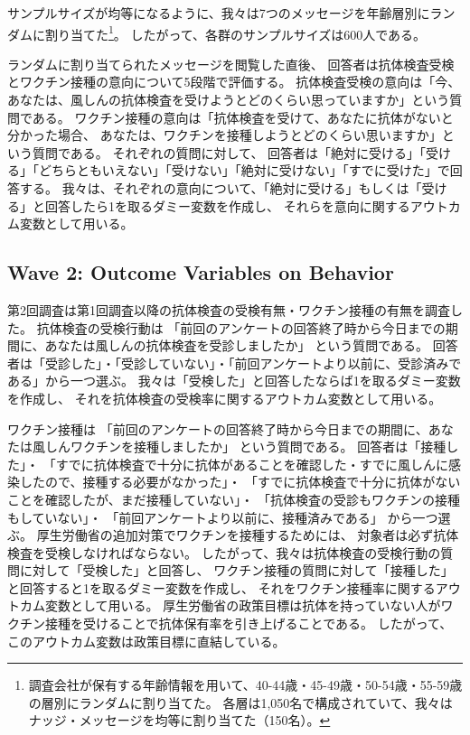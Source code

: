 \documentclass[
  11pt,
  a4paper,
]{article}
\begin{document}
サンプルサイズが均等になるように、我々は7つのメッセージを年齢層別にランダムに割り当てた\footnote{調査会社が保有する年齢情報を用いて、40-44歳・45-49歳・50-54歳・55-59歳の層別にランダムに割り当てた。
  各層は1,050名で構成されていて、我々はナッジ・メッセージを均等に割り当てた（150名）。}。
したがって、各群のサンプルサイズは600人である。

ランダムに割り当てられたメッセージを閲覧した直後、
回答者は抗体検査受検とワクチン接種の意向について5段階で評価する。
抗体検査受検の意向は「今、あなたは、風しんの抗体検査を受けようとどのくらい思っていますか」という質問である。
ワクチン接種の意向は「抗体検査を受けて、あなたに抗体がないと分かった場合、
あなたは、ワクチンを接種しようとどのくらい思いますか」という質問である。
それぞれの質問に対して、
回答者は「絶対に受ける」「受ける」「どちらともいえない」「受けない」「絶対に受けない」「すでに受けた」で回答する。
我々は、それぞれの意向について、「絶対に受ける」もしくは「受ける」と回答したら1を取るダミー変数を作成し、
それらを意向に関するアウトカム変数として用いる。

\hypertarget{wave2}{%
\subsection{Wave 2: Outcome Variables on Behavior}\label{wave2}}

第2回調査は第1回調査以降の抗体検査の受検有無・ワクチン接種の有無を調査した。
抗体検査の受検行動は
「前回のアンケートの回答終了時から今日までの期間に、あなたは風しんの抗体検査を受診しましたか」
という質問である。
回答者は「受診した」・「受診していない」・「前回アンケートより以前に、受診済みである」から一つ選ぶ。
我々は「受検した」と回答したならば1を取るダミー変数を作成し、
それを抗体検査の受検率に関するアウトカム変数として用いる。

ワクチン接種は
「前回のアンケートの回答終了時から今日までの期間に、あなたは風しんワクチンを接種しましたか」
という質問である。
回答者は「接種した」・
「すでに抗体検査で十分に抗体があることを確認した・すでに風しんに感染したので、接種する必要がなかった」・
「すでに抗体検査で十分に抗体がないことを確認したが、まだ接種していない」・
「抗体検査の受診もワクチンの接種もしていない」・
「前回アンケートより以前に、接種済みである」
から一つ選ぶ。
厚生労働省の追加対策でワクチンを接種するためには、
対象者は必ず抗体検査を受検しなければならない。
したがって、我々は抗体検査の受検行動の質問に対して「受検した」と回答し、
ワクチン接種の質問に対して「接種した」と回答すると1を取るダミー変数を作成し、
それをワクチン接種率に関するアウトカム変数として用いる。
厚生労働省の政策目標は抗体を持っていない人がワクチン接種を受けることで抗体保有率を引き上げることである。
したがって、このアウトカム変数は政策目標に直結している。
\end{document}
